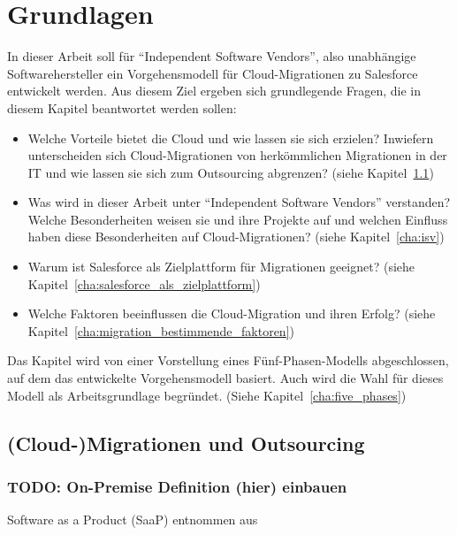 \section{Grundlagen}



In dieser Arbeit soll für "`Independent Software Vendors"', also unabhängige
Softwarehersteller ein Vorgehensmodell für Cloud-Migrationen zu Salesforce
entwickelt werden. Aus diesem Ziel ergeben sich grundlegende Fragen, die in
diesem Kapitel beantwortet werden sollen:
\begin{itemize}
	\item Welche Vorteile bietet die Cloud und wie lassen sie sich
erzielen? Inwiefern unterscheiden sich Cloud-Migrationen von herkömmlichen
Migrationen in der IT und wie lassen sie sich zum Outsourcing abgrenzen? (siehe
Kapitel~\ref{cha:definition_cloud-migration})
	\item Was wird in dieser Arbeit unter "`Independent Software Vendors"'
verstanden? Welche Besonderheiten weisen sie und ihre Projekte auf und welchen
Einfluss haben diese Besonderheiten auf Cloud-Migrationen? (siehe
Kapitel~\ref{cha:isv})
	\item Warum ist Salesforce als Zielplattform für Migrationen
geeignet? (siehe Kapitel~\ref{cha:salesforce_als_zielplattform})
	\item Welche Faktoren beeinflussen die Cloud-Migration und ihren
Erfolg? (siehe Kapitel~\ref{cha:migration_bestimmende_faktoren})
\end{itemize}
Das Kapitel wird von einer Vorstellung eines Fünf-Phasen-Modells abgeschlossen,
auf dem das entwickelte Vorgehensmodell basiert. Auch wird die Wahl für dieses
Modell als Arbeitsgrundlage begründet. (Siehe Kapitel~\ref{cha:five_phases})

\subsection{(Cloud-)Migrationen und Outsourcing}
\label{cha:definition_cloud-migration}

\subsubsection{TODO: On-Premise Definition (hier) einbauen}
Software as a Product (SaaP) entnommen aus 

